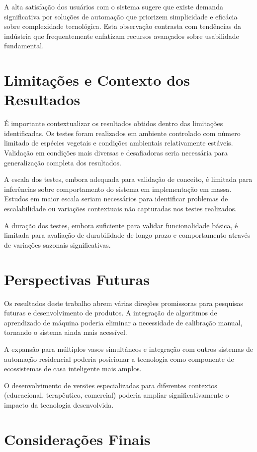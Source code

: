 A alta satisfação dos usuários com o sistema sugere que existe demanda significativa por soluções de automação que priorizem simplicidade e eficácia sobre complexidade tecnológica. Esta observação contrasta com tendências da indústria que frequentemente enfatizam recursos avançados sobre usabilidade fundamental.

\section{Limitações e Contexto dos Resultados}

É importante contextualizar os resultados obtidos dentro das limitações identificadas. Os testes foram realizados em ambiente controlado com número limitado de espécies vegetais e condições ambientais relativamente estáveis. Validação em condições mais diversas e desafiadoras seria necessária para generalização completa dos resultados.

A escala dos testes, embora adequada para validação de conceito, é limitada para inferências sobre comportamento do sistema em implementação em massa. Estudos em maior escala seriam necessários para identificar problemas de escalabilidade ou variações contextuais não capturadas nos testes realizados.

A duração dos testes, embora suficiente para validar funcionalidade básica, é limitada para avaliação de durabilidade de longo prazo e comportamento através de variações sazonais significativas.

\section{Perspectivas Futuras}

Os resultados deste trabalho abrem várias direções promissoras para pesquisas futuras e desenvolvimento de produtos. A integração de algoritmos de aprendizado de máquina poderia eliminar a necessidade de calibração manual, tornando o sistema ainda mais acessível.

A expansão para múltiplos vasos simultâneos e integração com outros sistemas de automação residencial poderia posicionar a tecnologia como componente de ecossistemas de casa inteligente mais amplos.

O desenvolvimento de versões especializadas para diferentes contextos (educacional, terapêutico, comercial) poderia ampliar significativamente o impacto da tecnologia desenvolvida.

\section{Considerações Finais}


